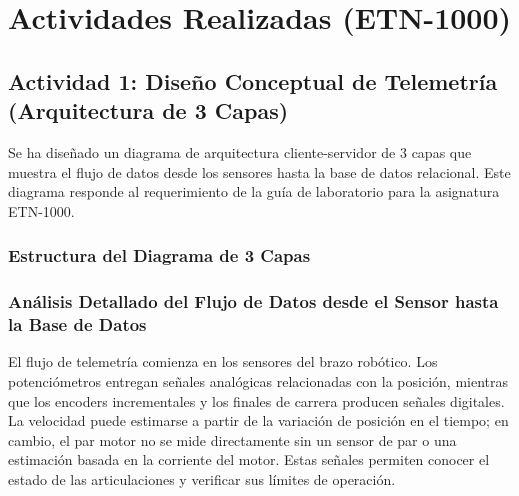 \documentclass[11pt]{article}
\begin{document}
\section{Actividades Realizadas (ETN-1000)}

\subsection{Actividad 1: Diseño Conceptual de Telemetría (Arquitectura de 3 Capas)}

Se ha diseñado un diagrama de arquitectura cliente-servidor de 3 capas que muestra el flujo de datos desde los sensores hasta la base de datos relacional. Este diagrama responde al requerimiento de la guía de laboratorio para la asignatura ETN-1000.

\subsubsection{Estructura del Diagrama de 3 Capas}



\subsubsection{Análisis Detallado del Flujo de Datos desde el Sensor hasta la Base de Datos}

El flujo de telemetría comienza en los sensores del brazo robótico. Los potenciómetros entregan señales analógicas relacionadas con la posición, mientras que los encoders incrementales y los finales de carrera producen señales digitales. La velocidad puede estimarse a partir de la variación de posición en el tiempo; en cambio, el par motor no se mide directamente sin un sensor de par o una estimación basada en la corriente del motor. Estas señales permiten conocer el estado de las articulaciones y verificar sus límites de operación.
\end{document}
